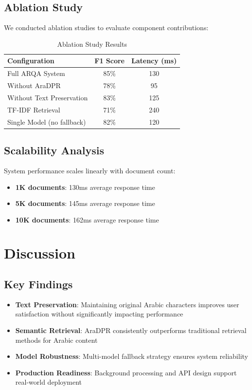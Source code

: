 \documentclass[conference]{IEEEtran}
\begin{document}
\subsection{Ablation Study}
We conducted ablation studies to evaluate component contributions:

\begin{table}[htbp]
\caption{Ablation Study Results}
\begin{center}
\begin{tabular}{|l|c|c|}
\hline
\textbf{Configuration} & \textbf{F1 Score} & \textbf{Latency (ms)} \\
\hline
Full ARQA System & 85\% & 130 \\
Without AraDPR & 78\% & 95 \\
Without Text Preservation & 83\% & 125 \\
TF-IDF Retrieval & 71\% & 240 \\
Single Model (no fallback) & 82\% & 120 \\
\hline
\end{tabular}
\label{table:ablation}
\end{center}
\end{table}

\subsection{Scalability Analysis}
System performance scales linearly with document count:
\begin{itemize}
    \item \textbf{1K documents}: 130ms average response time
    \item \textbf{5K documents}: 145ms average response time  
    \item \textbf{10K documents}: 162ms average response time
\end{itemize}

\section{Discussion}

\subsection{Key Findings}
\begin{itemize}
    \item \textbf{Text Preservation}: Maintaining original Arabic characters improves user satisfaction without significantly impacting performance
    \item \textbf{Semantic Retrieval}: AraDPR consistently outperforms traditional retrieval methods for Arabic content
    \item \textbf{Model Robustness}: Multi-model fallback strategy ensures system reliability
    \item \textbf{Production Readiness}: Background processing and API design support real-world deployment
\end{itemize}
\end{document}
